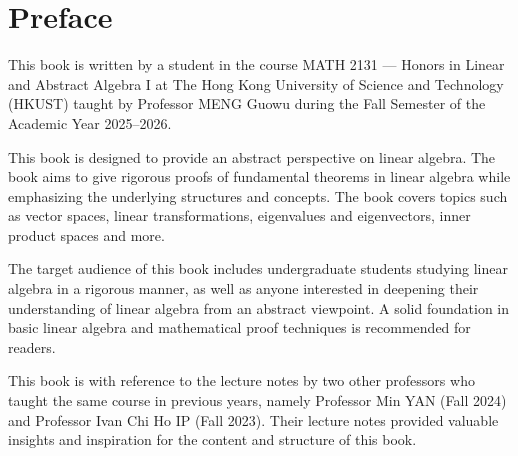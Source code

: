 \chapter*{Preface}

This book is written by a student in the course MATH 2131 --- Honors in Linear and Abstract Algebra I at The Hong Kong University of Science and Technology (HKUST) taught by Professor MENG Guowu during the Fall Semester of the Academic Year 2025--2026.

This book is designed to provide an abstract perspective on linear algebra. The book aims to give rigorous proofs of fundamental theorems in linear algebra while emphasizing the underlying structures and concepts. The book covers topics such as vector spaces, linear transformations, eigenvalues and eigenvectors, inner product spaces and more.

The target audience of this book includes undergraduate students studying linear algebra in a rigorous manner, as well as anyone interested in deepening their understanding of linear algebra from an abstract viewpoint. A solid foundation in basic linear algebra and mathematical proof techniques is recommended for readers.

This book is with reference to the lecture notes by two other professors who taught the same course in previous years, namely Professor Min YAN (Fall 2024) and Professor Ivan Chi Ho IP (Fall 2023). Their lecture notes provided valuable insights and inspiration for the content and structure of this book.